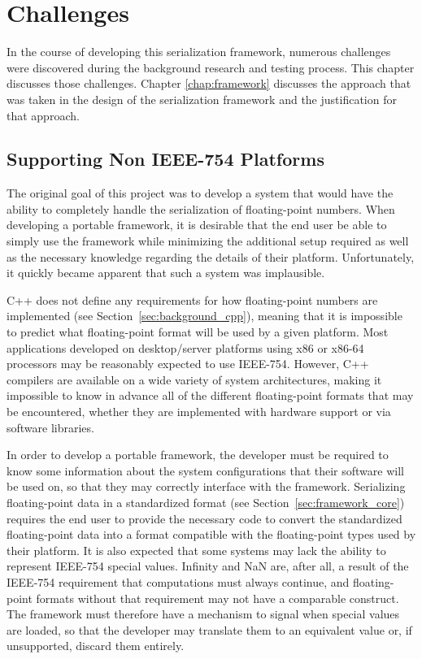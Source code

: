 \chapter{Challenges}
\label{chap:challenges}
In the course of developing this serialization framework, numerous challenges were discovered during the background research and testing process. This chapter discusses those challenges. Chapter \ref{chap:framework} discusses the approach that was taken in the design of the serialization framework and the justification for that approach.

\section{Supporting Non IEEE-754 Platforms}
\label{sec:challenges_nonconforming_platforms}
The original goal of this project was to develop a system that would have the ability to completely handle the serialization of floating-point numbers. When developing a portable framework, it is desirable that the end user be able to simply use the framework while minimizing the additional setup required as well as the necessary knowledge regarding the details of their platform. Unfortunately, it quickly became apparent that such a system was implausible.

C++ does not define any requirements for how floating-point numbers are implemented (see Section~\ref{sec:background_cpp}), meaning that it is impossible to predict what floating-point format will be used by a given platform. Most applications developed on desktop/server platforms using x86 or x86-64 processors may be reasonably expected to use IEEE-754. However, C++ compilers are available on a wide variety of system architectures, making it impossible to know in advance all of the different floating-point formats that may be encountered, whether they are implemented with hardware support or via software libraries.

In order to develop a portable framework, the developer must be required to know some information about the system configurations that their software will be used on, so that they may correctly interface with the framework. Serializing floating-point data in a standardized format (see Section~\ref{sec:framework_core}) requires the end user to provide the necessary code to convert the standardized floating-point data into a format compatible with the floating-point types used by their platform. It is also expected that some systems may lack the ability to represent IEEE-754 special values. Infinity and NaN are, after all, a result of the IEEE-754 requirement that computations must always continue, and floating-point formats without that requirement may not have a comparable construct. The framework must therefore have a mechanism to signal when special values are loaded, so that the developer may translate them to an equivalent value or, if unsupported, discard them entirely.


